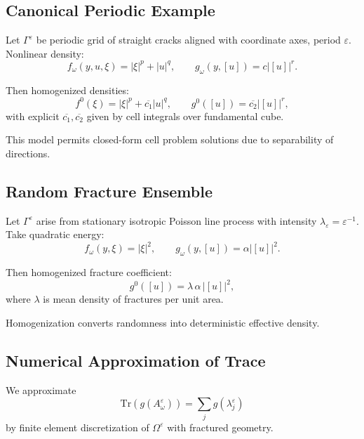 \subsection{Canonical Periodic Example}

\begin{example}
Let $\Gamma^\varepsilon$ be periodic grid of straight cracks aligned with coordinate axes, period $\varepsilon$.  
Nonlinear density:
\[
f_\omega(y,u,\xi) = |\xi|^p + |u|^q, \qquad g_\omega(y,[u]) = c|[u]|^r.
\]

Then homogenized densities:
\[
f^0(\xi) = |\xi|^p + \overline{c_1}|u|^q, \qquad g^0([u]) = \overline{c_2}|[u]|^r,
\]
with explicit $\overline{c_1},\overline{c_2}$ given by cell integrals over fundamental cube.
\end{example}

\begin{remark}
This model permits closed-form cell problem solutions due to separability of directions.  
\end{remark}

\subsection{Random Fracture Ensemble}

\begin{example}
Let $\Gamma^\varepsilon$ arise from stationary isotropic Poisson line process with intensity $\lambda_\varepsilon = \varepsilon^{-1}$.  
Take quadratic energy:
\[
f_\omega(y,\xi) = |\xi|^2, \qquad g_\omega(y,[u]) = \alpha |[u]|^2.
\]

Then homogenized fracture coefficient:
\[
g^0([u]) = \lambda \,\alpha \, |[u]|^2,
\]
where $\lambda$ is mean density of fractures per unit area.  
\end{example}

\begin{remark}
Homogenization converts randomness into deterministic effective density.  
\end{remark}

\subsection{Numerical Approximation of Trace}

We approximate
\[
\mathrm{Tr}(g(A^\varepsilon_\omega)) = \sum_{j} g(\lambda_j^\varepsilon)
\]
by finite element discretization of $\Omega^\varepsilon$ with fractured geometry.

